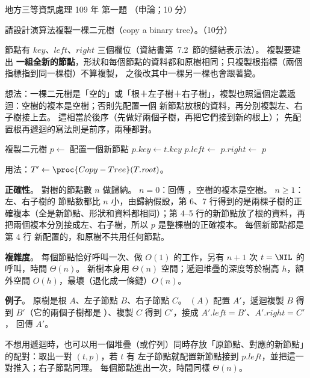 \begin{pastexam}[label={px:df3-109-ds-01}]{地方三等資訊處理 109 年 第一題}
（申論；10 分）

請設計演算法複製一棵二元樹（copy a binary tree）。（10分）
\end{pastexam}

\begin{pastsoln}
節點有 $\mathit{key}$、$\mathit{left}$、$\mathit{right}$ 三個欄位（資結書第~7.2~節的鏈結表示法）。 複製要建出
\textbf{一組全新的節點}，形狀和每個節點的資料都和原樹相同；只複製根指標（兩個指標指到同一棵樹）不算複製，
之後改其中一棵另一棵也會跟著變。

想法：一棵二元樹是「空的」或「根＋左子樹＋右子樹」，複製也照這個定義遞迴：空樹的複本是空樹；否則先配置一個
新節點放根的資料，再分別複製左、右子樹接上去。 這相當於後序（先做好兩個子樹，再把它們接到新的根上）；
先配置根再遞迴的寫法則是前序，兩種都對。
\begin{pseudo}[unbreakable]{複製二元樹}
 
        \State \Return \NIL
    \EndIf
    \State $p \gets$ 配置一個新節點
    \State $p.\mathit{key} \gets t.\mathit{key}$
    \State $p.\mathit{left} \gets$ 
    \State $p.\mathit{right} \gets$ 
    \State \Return $p$
\EndFunction
\end{pseudo}
用法：$T' \gets \proc{Copy-Tree}(T.\mathit{root})$。

\textbf{正確性}。 對樹的節點數 $n$ 做歸納。 $n = 0$：回傳 \NIL，空樹的複本是空樹。 $n \ge 1$：左、右子樹的
節點數都比 $n$ 小，由歸納假設，第 6、7 行得到的是兩棵子樹的正確複本（全是新節點、形狀和資料都相同）；第 4--5
行的新節點放了根的資料，再把兩個複本分別接成左、右子樹，所以 $p$ 是整棵樹的正確複本。 每個新節點都是第 4 行
新配置的，和原樹不共用任何節點。

\textbf{複雜度}。 每個節點恰好呼叫一次、做 $O(1)$ 的工作，另有 $n + 1$ 次 $t = \NIL$ 的呼叫，時間 $\Theta(n)$。
新樹本身用 $\Theta(n)$ 空間；遞迴堆疊的深度等於樹高 $h$，額外空間 $O(h)$，最壞（退化成一條鏈）$O(n)$。

\textbf{例子}。 原樹是根 $A$、左子節點 $B$、右子節點 $C$。 $(A)$ 配置 $A'$，遞迴複製 $B$ 得到
$B'$（它的兩個子樹都是 \NIL）、複製 $C$ 得到 $C'$，接成 $A'.\mathit{left} = B'$、$A'.\mathit{right} = C'$，
回傳 $A'$。

不想用遞迴時，也可以用一個堆疊（或佇列）同時存放「原節點、對應的新節點」的配對：取出一對 $(t, p)$，若 $t$ 有
左子節點就配置新節點接到 $p.\mathit{left}$，並把這一對推入；右子節點同理。 每個節點進出一次，時間同樣
$\Theta(n)$。
\end{pastsoln}
